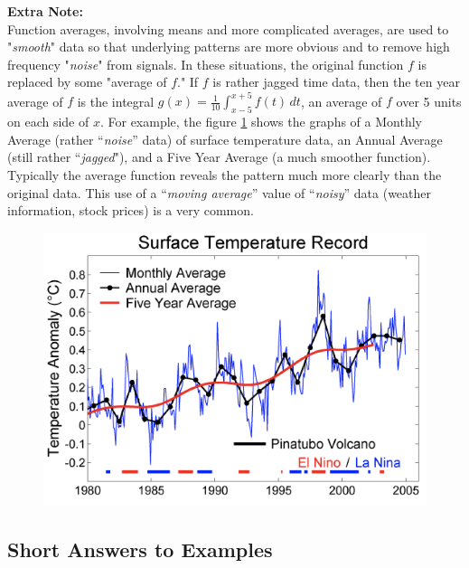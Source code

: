 \noindent \textbf{Extra Note:}\\

\noindent Function averages, involving means and more complicated averages, are used to "\emph{smooth}" data so that underlying patterns are more obvious and to remove high frequency "\emph{noise}" from signals. In these situations, the original function $f$ is replaced by some "average of $f$." If $f$ is rather jagged time data, then the ten year average of $f$ is the integral $g(x)=\displaystyle\frac{1}{10}\int_{x-5}^{x+5} f(t)\, dt$, an average of $f$ over 5 units on each side of $x$. For example, the figure \ref{fig:temperature}  shows the graphs of a Monthly Average (rather “\emph{noise}” data) of surface temperature data, an Annual Average (still rather “\emph{jagged}"), and a Five Year Average (a much smoother function). Typically the average function reveals the pattern much more clearly than the original data. This use of a “\emph{moving average}” value of “\emph{noisy}” data (weather information, stock prices) is a very common.
\begin{figure}[h!]
    \centering
    \includegraphics[scale=0.8]{images/defIntgApp/temperature.png}
    \caption{}
    \label{fig:temperature}
\end{figure}







\vspace*{\fill}
\subsection*{Short Answers to Examples}





